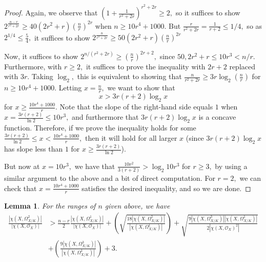 \documentclass{article}
\newtheorem{lemma}[thm]{Lemma}
\theoremstyle{definition}
\theoremstyle{remark}
\begin{document}
\begin{proof}
\par Again, we observe that $\left(1 + \frac{1}{r^2 + 2r}\right)^{r^2 + 2r} \geq 2,$ so it suffices to show $2^{\frac{n-r}{r^2 + 2r}} \geq 40(2r^2 + r)\left(\frac{n}{r}\right)^{2r}$ when $n \geq 10r^4 + 1000.$ But $\frac{r}{r^2 + 2r} = \frac{1}{r+2} \leq 1/4,$ so as $2^{1/4} \leq \frac{5}{4},$ it suffices to show $2^{\frac{n}{r^2 + 2r}} \geq 50(2r^2 + r)\left(\frac{n}{r}\right)^{2r}$
\par Now, it suffices to show $2^{n/(r^2 + 2r)} \geq\left(\frac{n}{r}\right)^{2r + 2},$ since $50, 2r^2 + r \leq 10r^3 < n/r.$ Furthermore, with $r \geq 2,$ it suffices to prove the inequality with $2r + 2$ replaced with $3r.$ Taking $\log_2,$ this is equivalent to showing that $\frac{n}{r^2 + 2r} \geq 3r \log_2(\frac{n}{r})$ for $n \geq 10r^4 + 1000.$ Letting $x = \frac{n}{r},$ we want to show that $$x > 3r(r+2) \log_2x$$ for $x \geq \frac{10r^4 + 1000}{r}.$ Note that the slope of the right-hand side equals $1$ when $x = \frac{3r(r+2)}{\ln 2} \leq 10r^3,$ and furthermore that $3r(r+2) \log_2 x$ is a concave function. Therefore, if we prove the inequality holds for some $\frac{3r(r+2)}{\ln 2} \leq x < \frac{10r^4 + 1000}{r},$ then it will hold for all larger $x$ (since $3r(r+2) \log_2 x$ has slope less than $1$ for $x \geq \frac{3r(r+2)}{\ln 2}$). 
\par But now at $x = 10r^3,$ we have that $\frac{10r^2}{3(r+2)} > \log_2 10r^3$ for $r \geq 3,$ by using a similar argument to the above and a bit of direct computation. For $r = 2,$ we can check that $x = \frac{10r^4 + 1000}{r}$ satisfies the desired inequality, and so we are done.
\end{proof}
\begin{lemma}\label{lem: remaining terms in q=2}
For the ranges of $n$ given above, we have 
\begin{align*}\frac{|\chi(X, \Omega^2_{X/K})|}{|\chi(X, \mathcal{O}_X)|} & > \frac{n-r}{2} \frac{|\chi(X, \Omega^1_{X/K})|}{|\chi(X, \mathcal{O}_{X})|} + \left(\sqrt{\frac{18|\chi(X, \Omega_{X/K}^5)|}{|\chi(X, \Omega_{X/K}^1)|}}\right) + \sqrt{\frac{9|\chi(X, \Omega_{X/K}^3)||\chi(X, \Omega_{X/K}^1)|}{2|\chi(X, \mathcal{O}_{X})^2|}} \\ & + \left(\frac{9|\chi(X, \Omega_{X/K}^3)|}{|\chi(X, \Omega_{X/K}^1)|}\right) + 3.\end{align*}
\end{lemma}
\end{document}
